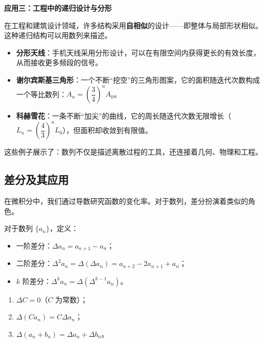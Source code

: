 \documentclass[fontset=fandol]{ctexart}
\newenvironment{custom}[1]{\par\noindent\textbf{#1}\quad}{\par\vspace{0.8em}}
\begin{document}
\begin{custom}{应用三：工程中的递归设计与分形}

在工程和建筑设计领域，许多结构采用\textbf{自相似}的设计——即整体与局部形状相似。这种递归结构可以用数列来描述。

\begin{itemize}
\item \textbf{分形天线}：手机天线采用分形设计，可以在有限空间内获得更长的有效长度，从而接收更多频段的信号。
\item \textbf{谢尔宾斯基三角形}：一个不断“挖空”的三角形图案，它的面积随迭代次数构成一个等比数列：\(A_n = \left(\dfrac{3}{4}\right)^n A_0\)。
\item \textbf{科赫雪花}：一条不断“加尖”的曲线，它的周长随迭代次数无限增长（\(L_n = \left(\dfrac{4}{3}\right)^n L_0\)），但面积却收敛到有限值。
\end{itemize}

这些例子展示了：数列不仅是描述离散过程的工具，还连接着几何、物理和工程。
\end{custom}

\subsection{差分及其应用}

在微积分中，我们通过导数研究函数的变化率。对于数列，差分扮演着类似的角色。

\begin{definition}[差分]
对于数列 \(\{a_n\}\)，定义：
\begin{itemize}
\item 一阶差分：\(\Delta a_n = a_{n+1} - a_n\)；
\item 二阶差分：\(\Delta^2 a_n = \Delta(\Delta a_n) = a_{n+2} - 2a_{n+1} + a_n\)；
\item \(k\) 阶差分：\(\Delta^k a_n = \Delta(\Delta^{k-1} a_n)\)。
\end{itemize}
\end{definition}

\begin{proposition}[差分的性质]
\begin{enumerate}
\item \(\Delta C = 0\)（\(C\) 为常数）；
\item \(\Delta(C a_n) = C \Delta a_n\)；
\item \(\Delta(a_n + b_n) = \Delta a_n + \Delta b_n\)。
\end{enumerate}
\end{proposition}
\end{document}
